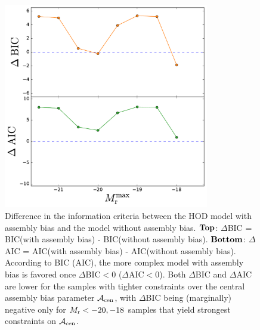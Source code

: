 \documentclass[twocolumn]{aastex61}
\newcommand{\acen}{\mathcal{A}_{\rm cen}}
\begin{document}
\begin{figure}[p]~\\
\begin{center}
\includegraphics[width=0.8\textwidth]{IC.pdf}
\caption{Difference in the information criteria between the HOD model with assembly bias and the model without assembly bias. $\bf{Top}$: $\Delta$BIC = BIC(with assembly bias) - BIC(without assembly bias). $\bf{Bottom}$: $\Delta$AIC = AIC(with assembly bias) - AIC(without assembly bias). According to BIC (AIC), the more complex model with assembly bias is favored once $\Delta$BIC$<0$ ($\Delta$AIC$<0$). Both $\Delta$BIC and $\Delta$AIC are lower for the samples with tighter constraints over the central assembly bias parameter $\acen$, with $\Delta$BIC being (marginally) negative only for $M_{\rm r}<-20,-18$ samples that yield strongest constraints on $\acen$.} 
\label{fig:ic}
\end{center}
\end{figure}

\end{document}
